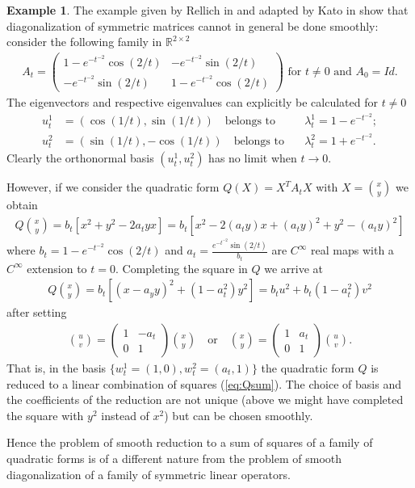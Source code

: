 \documentclass[12pt,reqno]{amsart}
\numberwithin{equation}{section}
\theoremstyle{plain}
\theoremstyle{definition}
\newtheorem{example}{Example}
\newcommand{\RR}{{\mathbb R}}
\begin{document}
\begin{example}\label{ex:rellich}
  The example given by Rellich in
  \cite[pp. 52-53]{Rellich69} and adapted by Kato in
  \cite[Example 5.3, Section II.5.4]{Kato95} show that
  diagonalization of symmetric matrices cannot in general be
  done smoothly: consider the following family in
  $\RR^{2\times 2}$
  \begin{align*}
    A_t=
    \begin{pmatrix}
      1-e^{-t^{-2}}\cos(2/t) & -e^{-t^{-2}}\sin(2/t)
      \\
       -e^{-t^{-2}}\sin(2/t) & 1-e^{-t^{-2}}\cos(2/t)
    \end{pmatrix}
    \text{ for $t\neq0$ and  }
    A_0=Id.
  \end{align*}
  The eigenvectors and respective eigenvalues can explicitly
  be calculated for $t\neq0$
  \begin{align*}
    u_t^1&=(\cos(1/t),\sin(1/t))
    \quad\text{belongs to}\quad
    &\lambda_t^1=1-e^{-t^{-2}};
    \\
    u_t^2&=(\sin(1/t),-\cos(1/t))
    \quad\text{belongs to}\quad
    &\lambda_t^2=1+e^{-t^{-2}}.
  \end{align*}
Clearly the orthonormal basis $(u_t^1,u_t^2)$ has no limit
when $t\to0$. 

However, if we consider the quadratic form $Q(X)=X^T A_t X$
with $X=\binom{x}{y}$ we obtain
\begin{align*}
  Q\binom{x}{y}=b_t[x^2+y^2-2a_tyx]=b_t[x^2-2(a_t y)x+(a_ty)^2+y^2-(a_ty)^2]
\end{align*}
where $b_t=1-e^{-t^{-2}}\cos(2/t)$ and
$a_t=\frac{e^{-t^{-2}}\sin(2/t)}{b_t}$ are $C^\infty$ real
maps with a $C^\infty$ extension to $t=0$. Completing the
square in $Q$ we arrive at
  \begin{align}\label{eq:Qsum}
    Q\binom{x}{y}=b_t[(x-a_yy)^2+(1-a_t^2)y^2]=b_tu^2+b_t(1-a_t^2)v^2
  \end{align}
after setting
\begin{align*}
  \binom{u}{v}=
  \begin{pmatrix}
    1 & -a_t \\ 0 & 1
  \end{pmatrix}
  \binom{x}{y}
  \quad\text{or}\quad
  \binom{x}{y}=
  \begin{pmatrix}
    1 & a_t \\ 0 & 1
  \end{pmatrix}
  \binom{u}{v}.
\end{align*}
That is, in the basis $\{w^1_t=(1,0), w^2_t=(a_t,1)\}$ the
quadratic form $Q$ is reduced to a linear combination of
squares (\ref{eq:Qsum}). The choice of basis and the
coefficients of the reduction are not unique (above we might
have completed the square with $y^2$ instead of $x^2$) but
can be chosen smoothly.

Hence the problem of smooth reduction to a sum of squares of
a family of quadratic forms is of a different nature from
the problem of smooth diagonalization of a family of
symmetric linear operators.
\end{example}
\end{document}
